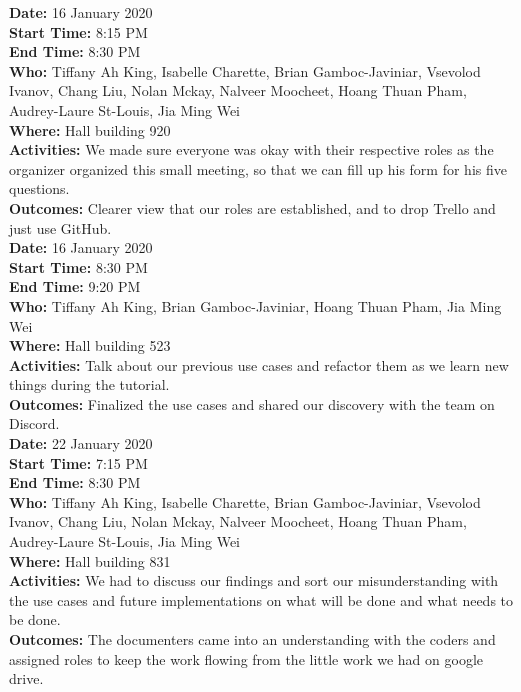 \documentclass[12pt]{article}
\begin{document}
{\bf Date:} 16 January 2020\\
{\bf Start Time:} 8:15 PM\\
{\bf End Time:} 8:30 PM \\
{\bf Who:} Tiffany Ah King, Isabelle Charette, Brian Gamboc-Javiniar, Vsevolod Ivanov, Chang Liu, Nolan Mckay, Nalveer Moocheet, Hoang Thuan Pham, Audrey-Laure St-Louis, Jia Ming Wei\\
{\bf Where:} Hall building 920 \\
{\bf Activities:} We made sure everyone was okay with their respective roles as the organizer organized this small meeting, so that we can fill up his form for his five questions.\\
{\bf Outcomes:} Clearer view that our roles are established, and to drop Trello and just use GitHub.\\

{\bf Date:} 16 January 2020\\
{\bf Start Time:} 8:30 PM\\
{\bf End Time:} 9:20 PM \\
{\bf Who:} Tiffany Ah King, Brian Gamboc-Javiniar, Hoang Thuan Pham, Jia Ming Wei\\
{\bf Where:} Hall building 523 \\
{\bf Activities:} Talk about our previous use cases and refactor them as we learn new things during the tutorial.\\
{\bf Outcomes:} Finalized the use cases and shared our discovery with the team on Discord.\\

{\bf Date:} 22 January 2020\\
{\bf Start Time:} 7:15 PM\\
{\bf End Time:} 8:30 PM \\
{\bf Who:} Tiffany Ah King, Isabelle Charette, Brian Gamboc-Javiniar, Vsevolod Ivanov, Chang Liu, Nolan Mckay, Nalveer Moocheet, Hoang Thuan Pham, Audrey-Laure St-Louis, Jia Ming Wei\\
{\bf Where:} Hall building 831 \\
{\bf Activities:} We had to discuss our findings and sort our misunderstanding with the use cases and future implementations on what will be done and what needs to be done.\\
{\bf Outcomes:} The documenters came into an understanding with the coders and assigned roles to keep the work flowing from the little work we had on google drive.\\
\end{document}
